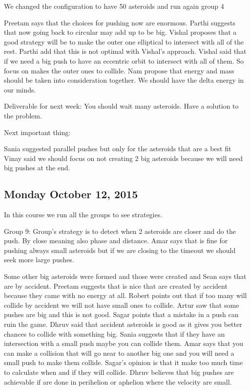 We changed the configuration to have 50 asteroids and run again group 4

Preetam says that the choices for pushing now are enormous.
Parthi suggests that now going back to circular may add up to be big.
Vishal proposes that a good strategy will be to make the outer one elliptical to intersect with all of the rest.
Parthi add that this is not optimal with Vishal’s approach.
Vishal said that if we need a big push to have an eccentric orbit to intersect with all of them. So focus on makes the outer ones to collide.
Nam propose that energy and mass should be taken into consideration together. We should have the delta energy in our minds.

Deliverable for next week: You should wait many asteroids. Have a solution to the problem.

Next important thing:

Sania suggested parallel pushes but only for the asteroids that are a best fit
Vinay said we should focus on not creating 2 big asteroids because we will need big pushes at the end.
\subsection{Monday October 12, 2015}
In this course we run all the groups to see strategies.

Group 9:
Group’s strategy is to detect when 2 asteroids are closer and do the push. By close meaning also phase and distance.
Amar says that is fine for pushing always small asteroids but if we are closing to the timeout we should seek more large pushes.

Some other big asteroids were formed and those were created and Sean says that are by accident.
Preetam suggests that is nice that are created by accident because they came with no energy at all.
Robert points out that if too many will collide by accident we will not have small ones to collide.
Artur saw that some pushes are big and this is not good.
Sagar points that a mistake in a push can ruin the game.
Dhruv said that accident asteroids is good as it gives you better chances to collide with something big. 
Sania suggests that if they have an intersection with a small push maybe you can collide them.
Amar says that you can make a collision that will go near to another big one and you will need a small push to make them collide.
Sagar’s opinion is that it make too much time to calculate when and if they will collide.
Dhruv believes that big pushes are achievable if are done in perihelion or aphelion where the velocity are small. 

